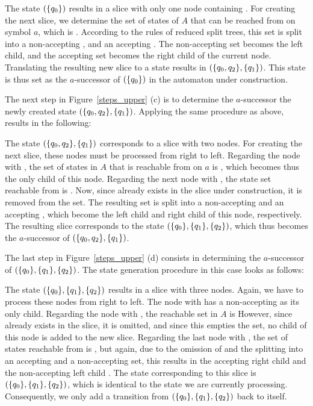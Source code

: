 \begin{center}
\SlicesOne
\end{center}

The state $(\{q_{0}\})$ results in a slice with only one node containing . For creating the next slice, we determine the set of states of $A$ that can be reached from  on symbol $a$, which is . According to the rules of reduced split trees, this set is split into a non-accepting , and an accepting . The non-accepting set  becomes the left child, and the accepting set  becomes the right child of the current node. Translating the resulting new slice to a state results in $(\{q_{0},q_{2}\}, \{q_{1}\})$. This state is thus set as the $a$-successor of $(\{q_{0}\})$ in the automaton under construction.

The next step in Figure~\ref{steps_upper} (c) is to determine the $a$-successor the newly created state $(\{q_{0},q_{2}\}, \{q_{1}\})$. Applying the same procedure as above, results in the following:

\begin{center}
\SlicesTwo
\end{center}

The state $(\{q_{0},q_{2}\}, \{q_{1}\})$ corresponds to a slice with two nodes. For creating the next slice, these nodes must be processed from right to left. Regarding the node with , the set of states in $A$ that is reachable from  on $a$ is , which becomes thus the only child of this node. Regarding the next node with , the state set reachable from  is . Now, since  already exists in the slice under construction, it is removed from the set. The resulting set  is split into a non-accepting  and an accepting , which become the left child and right child of this node, respectively. The resulting slice corresponds to the state $(\{q_{0}\}, \{q_{1}\}, \{q_{2}\})$, which thus becomes the $a$-successor of $(\{q_{0},q_{2}\}, \{q_{1}\})$.

The last step in Figure~\ref{steps_upper} (d) consists in determining the $a$-successor of $(\{q_{0}\}, \{q_{1}\}, \{q_{2}\})$. The state generation procedure in this case looks as follows:

\begin{center}
\SlicesThree
\end{center}

The state $(\{q_{0}\}, \{q_{1}\}, \{q_{2}\})$ results in a slice with three nodes. Again, we have to process these nodes from right to left. The node with  has a non-accepting  as its only child. Regarding the node with , the reachable set in $A$ is  However, since  already exists in the slice, it is omitted, and since this empties the set, no child of this node is added to the new slice. Regarding the last node with , the set of states reachable from  is , but again, due to the omission of  and the splitting into an accepting and a non-accepting set, this results in the accepting right child  and the non-accepting left child . The state corresponding to this slice is $(\{q_{0}\}, \{q_{1}\}, \{q_{2}\})$, which is identical to the state we are currently processing. Consequently, we only add a transition from $(\{q_{0}\}, \{q_{1}\}, \{q_{2}\})$ back to itself.

